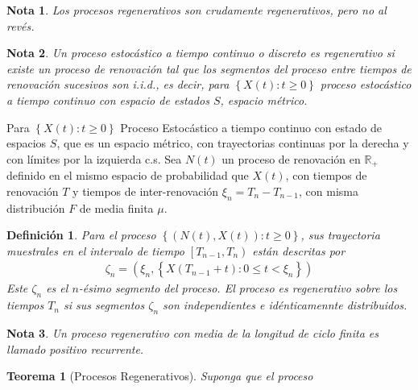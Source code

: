 \documentclass{article}
\newtheorem{Def}{Definición}[section]
\newtheorem{Teo}{Teorema}[section]
\newtheorem{Note}{Nota}[section]
\newcommand{\rea}{\mathbb{R}}
\numberwithin{equation}{section}
\begin{document}
\begin{Note}
Los procesos regenerativos son crudamente regenerativos, pero no al rev\'es.
\end{Note}


\begin{Note}
Un proceso estoc\'astico a tiempo continuo o discreto es regenerativo si existe un proceso de renovaci\'on  tal que los segmentos del proceso entre tiempos de renovaci\'on sucesivos son i.i.d., es decir, para $\left\{X\left(t\right):t\geq0\right\}$ proceso estoc\'astico a tiempo continuo con espacio de estados $S$, espacio m\'etrico.
\end{Note}

Para $\left\{X\left(t\right):t\geq0\right\}$ Proceso Estoc\'astico a tiempo continuo con estado de espacios $S$, que es un espacio m\'etrico, con trayectorias continuas por la derecha y con l\'imites por la izquierda c.s. Sea $N\left(t\right)$ un proceso de renovaci\'on en $\rea_{+}$ definido en el mismo espacio de probabilidad que $X\left(t\right)$, con tiempos de renovaci\'on $T$ y tiempos de inter-renovaci\'on $\xi_{n}=T_{n}-T_{n-1}$, con misma distribuci\'on $F$ de media finita $\mu$.



\begin{Def}
Para el proceso $\left\{\left(N\left(t\right),X\left(t\right)\right):t\geq0\right\}$, sus trayectoria muestrales en el intervalo de tiempo $\left[T_{n-1},T_{n}\right)$ est\'an descritas por
\begin{eqnarray*}
\zeta_{n}=\left(\xi_{n},\left\{X\left(T_{n-1}+t\right):0\leq t<\xi_{n}\right\}\right)
\end{eqnarray*}
Este $\zeta_{n}$ es el $n$-\'esimo segmento del proceso. El proceso es regenerativo sobre los tiempos $T_{n}$ si sus segmentos $\zeta_{n}$ son independientes e id\'enticamennte distribuidos.
\end{Def}

\begin{Note}
Un proceso regenerativo con media de la longitud de ciclo finita es llamado positivo recurrente.
\end{Note}

\begin{Teo}[Procesos Regenerativos]
Suponga que el proceso
\end{Teo}
\end{document}
